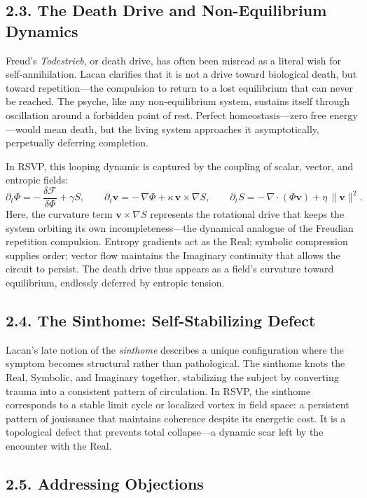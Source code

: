 \documentclass[12pt,a4paper]{article}
\begin{document}
\subsection{2.3. The Death Drive and Non-Equilibrium Dynamics}

Freud’s \emph{Todestrieb}, or death drive, has often been misread as a literal wish for self-annihilation.  
Lacan clarifies that it is not a drive toward biological death, but toward repetition—the compulsion to return to a lost equilibrium that can never be reached.  
The psyche, like any non-equilibrium system, sustains itself through oscillation around a forbidden point of rest.  
Perfect homeostasis—zero free energy—would mean death, but the living system approaches it asymptotically, perpetually deferring completion.

In RSVP, this looping dynamic is captured by the coupling of scalar, vector, and entropic fields:
\[
\partial_t \Phi = -\,\frac{\delta \mathcal{F}}{\delta \Phi} + \gamma S,
\qquad
\partial_t \mathbf{v} = -\,\nabla \Phi + \kappa\,\mathbf{v}\!\times\!\nabla S,
\qquad
\partial_t S = -\,\nabla\!\cdot(\Phi\mathbf{v}) + \eta\,\|\mathbf{v}\|^2.
\]
Here, the curvature term \(\mathbf{v}\!\times\!\nabla S\) represents the rotational drive that keeps the system orbiting its own incompleteness—the dynamical analogue of the Freudian repetition compulsion.  
Entropy gradients act as the Real; symbolic compression supplies order; vector flow maintains the Imaginary continuity that allows the circuit to persist.  
The death drive thus appears as a field’s curvature toward equilibrium, endlessly deferred by entropic tension.

\subsection{2.4. The Sinthome: Self-Stabilizing Defect}

Lacan’s late notion of the \emph{sinthome} describes a unique configuration where the symptom becomes structural rather than pathological.  
The sinthome knots the Real, Symbolic, and Imaginary together, stabilizing the subject by converting trauma into a consistent pattern of circulation.  
In RSVP, the sinthome corresponds to a stable limit cycle or localized vortex in field space: a persistent pattern of jouissance that maintains coherence despite its energetic cost.  
It is a topological defect that prevents total collapse—a dynamic scar left by the encounter with the Real.

\subsection{2.5. Addressing Objections}
\end{document}
